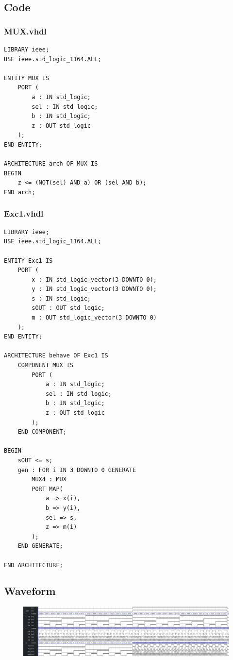 \documentclass[13pt,a4paper]{report}
\begin{document}
\subsection{Code}
\subsubsection{MUX.vhdl}
\begin{verbatim}
LIBRARY ieee;
USE ieee.std_logic_1164.ALL;

ENTITY MUX IS
	PORT (
		a : IN std_logic;
		sel : IN std_logic;
		b : IN std_logic;
		z : OUT std_logic
	);
END ENTITY;

ARCHITECTURE arch OF MUX IS
BEGIN
	z <= (NOT(sel) AND a) OR (sel AND b);
END arch;
\end{verbatim}

\subsubsection{Exc1.vhdl}
\begin{verbatim}
LIBRARY ieee;
USE ieee.std_logic_1164.ALL;

ENTITY Exc1 IS
	PORT (
		x : IN std_logic_vector(3 DOWNTO 0);
		y : IN std_logic_vector(3 DOWNTO 0);
		s : IN std_logic;
		sOUT : OUT std_logic;
		m : OUT std_logic_vector(3 DOWNTO 0)
	);
END ENTITY;

ARCHITECTURE behave OF Exc1 IS
	COMPONENT MUX IS
		PORT (
			a : IN std_logic;
			sel : IN std_logic;
			b : IN std_logic;
			z : OUT std_logic
		);
	END COMPONENT;

BEGIN
	sOUT <= s;
	gen : FOR i IN 3 DOWNTO 0 GENERATE
		MUX4 : MUX
		PORT MAP(
			a => x(i), 
			b => y(i), 
			sel => s, 
			z => m(i)
		);
	END GENERATE;

END ARCHITECTURE;
\end{verbatim}

\subsection{Waveform}
\begin{figure}[H]
\centering
\includegraphics[scale=1.1]{images/Exc1_waveform.png}
\end{figure}
\end{document}
